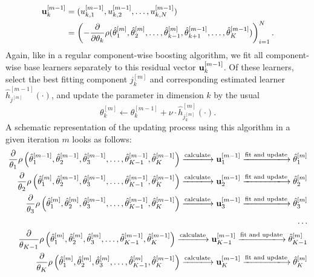 \begin{align*}
    \mathbf{u}_k^{[m-1]}&=(u_{k,1}^{[m-1]},u_{k,2}^{[m-1]},\ldots,u_{k,N}^{[m-1]})\\
    &=\left(-\frac{\partial}{\partial \theta_k}\rho(\hat{\theta}_1^{[m]},\hat{\theta}_2^{[m]},\ldots,\hat{\theta}_{k-1}^{[m]},\hat{\theta}_{k+1}^{[m-1]},\ldots,\hat{\theta}_{K}^{[m-1]})\right)_{i=1}^N.
\end{align*}
Again, like in a regular component-wise boosting algorithm, we fit all component-wise base learners separately to this residual vector $\mathbf{u}_k^{[m-1]}$. Of these learners, select the best fitting component $j_k^{[m]}$ and corresponding estimated learner $\hat{h}^{[m-1]}_{j^{[m]}}(\cdot)$, and update the parameter in dimension $k$ by the usual
\begin{equation}
    \theta_k^{[m]}\gets\theta_k^{[m-1]}+\nu\cdot \hat{h}^{[m]}_{j_k^{[m]}}(\cdot).
\end{equation}
A schematic representation of the updating process using this algorithm in a given iteration $m$ looks as follows:
\begin{align*}
    \frac{\partial}{\theta_1}\rho\left(\hat{\theta}_1^{[m-1]},\hat{\theta}_2^{[m-1]},\hat{\theta}_3^{[m-1]},\ldots,\hat{\theta}_{K-1}^{[m-1]},\hat{\theta}_K^{[m-1]}\right)
    \xlongrightarrow{\text{calculate}}\u_{1}^{[m-1]}
    \xlongrightarrow{\text{fit and update}}\hat{\theta}_{1}^{[m]} \\
    \frac{\partial}{\theta_2}\rho\left(\hat{\theta}_1^{[m]},\hat{\theta}_2^{[m-1]},\hat{\theta}_3^{[m-1]},\ldots,\hat{\theta}_{K-1}^{[m-1]},\hat{\theta}_K^{[m-1]}\right)
    \xlongrightarrow{\text{calculate}} \u_{2}^{[m-1]}
    \xlongrightarrow{\text{fit and update}}\hat{\theta}_{2}^{[m]} \\
    \frac{\partial}{\theta_3}\rho\left(\hat{\theta}_1^{[m]},\hat{\theta}_2^{[m]},\hat{\theta}_3^{[m-1]},\ldots,\hat{\theta}_{K-1}^{[m-1]},\hat{\theta}_K^{[m-1]}\right)
    \xlongrightarrow{\text{calculate}}\u_{3}^{[m-1]}
    \xlongrightarrow{\text{fit and update}}\hat{\theta}_{3}^{[m]} \\
    \ldots\\
    \frac{\partial}{\theta_{K-1}}\rho\left(\hat{\theta}_1^{[m]},\hat{\theta}_2^{[m]},\hat{\theta}_3^{[m]},\ldots,\hat{\theta}_{K-1}^{[m-1]},\hat{\theta}_K^{[m-1]}\right)
    \xlongrightarrow{\text{calculate}}\u_{K-1}^{[m-1]}
    \xlongrightarrow{\text{fit and update}}\hat{\theta}_{K-1}^{[m]} \\
    \frac{\partial}{\theta_K}\rho\left(\hat{\theta}_1^{[m]},\hat{\theta}_2^{[m]},\hat{\theta}_3^{[m]},\ldots,\hat{\theta}_{K-1}^{[m]},\hat{\theta}_K^{[m-1]}\right)
    \xlongrightarrow{\text{calculate}}\u_{K}^{[m-1]}
    \xlongrightarrow{\text{fit and update}}\hat{\theta}_{K}^{[m]}
\end{align*}
